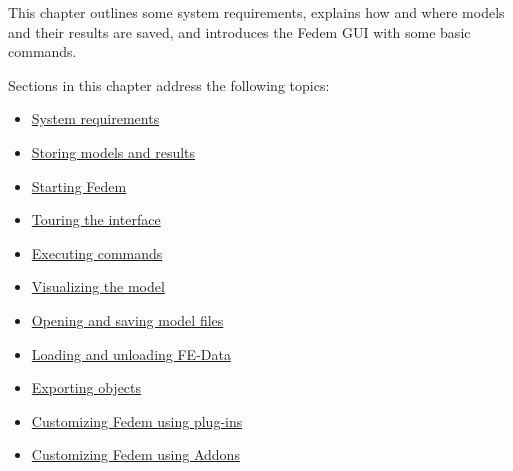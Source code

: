 %
%

%
%

\def\Variable#1{\textless#1\textgreater}
\def\Untitled{\File{untitled\_\Variable{\#}.fmm}}



This chapter outlines some system requirements,
explains how and where models and their results are saved,
and introduces the Fedem GUI with some basic commands.

Sections in this chapter address the following topics:

\begin{itemize}
\item
  \protect\hyperlink{system-requirements}
                    {System requirements}
\item
  \protect\hyperlink{storing-models-and-results}
                    {Storing models and results}
\item
  \protect\hyperlink{starting-fedem}
                    {Starting Fedem}
\item
  \protect\hyperlink{touring-the-interface}
                    {Touring the interface}
\item
  \protect\hyperlink{executing-commands}
                    {Executing commands}
\item
  \protect\hyperlink{visualizing-the-model}
                    {Visualizing the model}
\item
  \protect\hyperlink{opening-and-saving-model-files}
                    {Opening and saving model files}
\item
  \protect\hyperlink{loading-and-unloading-fe-data}
                    {Loading and unloading FE-Data}
\item
  \protect\hyperlink{exporting-objects}
                    {Exporting objects}
\item
  \protect\hyperlink{customizing-fedem-using-plug-ins}
                    {Customizing Fedem using plug-ins}
\item
  \protect\hyperlink{customizing-fedem-using-addons}
                    {Customizing Fedem using Addons}
\end{itemize}

